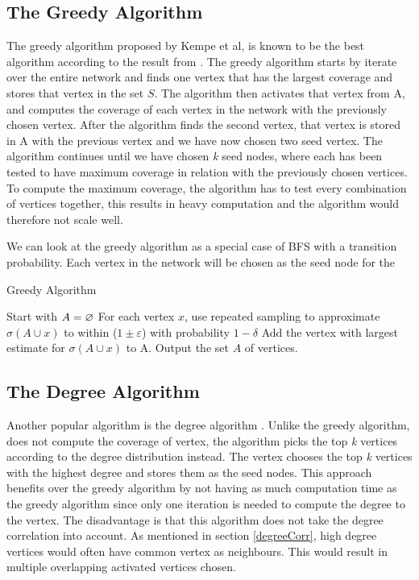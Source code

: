 \subsection{The Greedy Algorithm}
The greedy algorithm \cite{greedyInfluenc2005} \cite{Chen:2009:EIM:1557019.1557047} proposed by Kempe et al, is known to be the best algorithm according to the result from  \cite{greedyInfluenc2005}. The greedy algorithm starts by iterate over the entire network and finds one vertex that has the largest coverage and stores that vertex in the set $S$. The algorithm then activates that vertex from A, and computes the coverage of each vertex in the network with the previously chosen vertex. After the algorithm finds the second vertex, that vertex is stored in A with the previous vertex and we have now chosen two seed vertex. The algorithm continues until we have chosen \textit{k} seed nodes, where each has been tested to have maximum coverage in relation with the previously chosen vertices. To compute the maximum coverage, the algorithm has to test every combination of vertices together, this results in heavy computation and the algorithm would therefore not scale well.

We can look at the greedy algorithm as a special case of BFS with a transition probability. Each vertex in the network will be chosen as the seed node for the

 \begin{algorithm}
\caption{Greedy Algorithm}
\begin{algorithmic}[1]
\State Start with $A = \oldemptyset$
\State For each vertex $x$, use repeated sampling to approximate $\sigma(A \cup {x}) $ to within ($1 \pm \varepsilon$) with probability
$1 − \delta$
\State Add the vertex with largest estimate for $\sigma(A \cup {x})$ to A.
\EndWhile
\State Output the set $A$ of vertices.
\end{algorithmic}
\end{algorithm}

\subsection{The Degree Algorithm}
Another popular algorithm is the degree algorithm \cite{greedyInfluenc2005}. Unlike the greedy algorithm, does not compute the coverage of vertex, the algorithm picks the top \textit{k} vertices according to the degree distribution instead. The vertex chooses the top \textit{k} vertices with the highest degree and stores them as the seed nodes. This approach benefits over the greedy algorithm by not having as much computation time as the greedy algorithm since only one iteration is needed to compute the degree to the vertex. The disadvantage is that this algorithm does not take the degree correlation into account. As mentioned in section \ref{degreeCorr}, high degree vertices would often have common vertex as neighbours. This would result in multiple overlapping activated vertices chosen.

